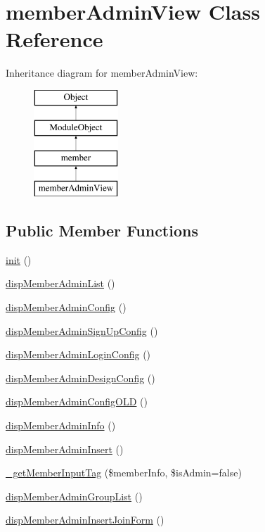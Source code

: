 \hypertarget{classmemberAdminView}{}\section{member\+Admin\+View Class Reference}
\label{classmemberAdminView}
Inheritance diagram for member\+Admin\+View\+:\begin{figure}[H]
\begin{center}
\leavevmode
\includegraphics[height=4.000000cm]{classmemberAdminView}
\end{center}
\end{figure}
\subsection*{Public Member Functions}
\begin{DoxyCompactItemize}
\item 
\hyperlink{classmemberAdminView_abfcff5343cc06cfa70fa1994b8a77d05}{init} ()
\item 
\hyperlink{classmemberAdminView_ab234e23e8317000c0f1722ab0f54ab99}{disp\+Member\+Admin\+List} ()
\item 
\hyperlink{classmemberAdminView_a8b5394bc1e9e1aae78bfaccad8e0edc9}{disp\+Member\+Admin\+Config} ()
\item 
\hyperlink{classmemberAdminView_af3ab8ea3d555e7e685c6c4706e3ea545}{disp\+Member\+Admin\+Sign\+Up\+Config} ()
\item 
\hyperlink{classmemberAdminView_a98debda6b76587e3633453e68c58a955}{disp\+Member\+Admin\+Login\+Config} ()
\item 
\hyperlink{classmemberAdminView_ab9f3ed7d905d09ea8ad49acdc22fe326}{disp\+Member\+Admin\+Design\+Config} ()
\item 
\hyperlink{classmemberAdminView_ad609a62a6d1aa8ec0c33fb6e30e20f08}{disp\+Member\+Admin\+Config\+O\+LD} ()
\item 
\hyperlink{classmemberAdminView_a9e87c4fbbb859f2557457b1935453dd4}{disp\+Member\+Admin\+Info} ()
\item 
\hyperlink{classmemberAdminView_ad7a3311686a49ab70e318fb66736258a}{disp\+Member\+Admin\+Insert} ()
\item 
\hyperlink{classmemberAdminView_a49f5bc2cf86576c040abfb686c21383b}{\+\_\+get\+Member\+Input\+Tag} (\$member\+Info, \$is\+Admin=false)
\item 
\hyperlink{classmemberAdminView_a4a1e4b416515bdcdb1459f44398eb412}{disp\+Member\+Admin\+Group\+List} ()
\item 
\hyperlink{classmemberAdminView_a049d24f5adc0c5eb534902e44944ff08}{disp\+Member\+Admin\+Insert\+Join\+Form} ()
\end{DoxyCompactItemize}
